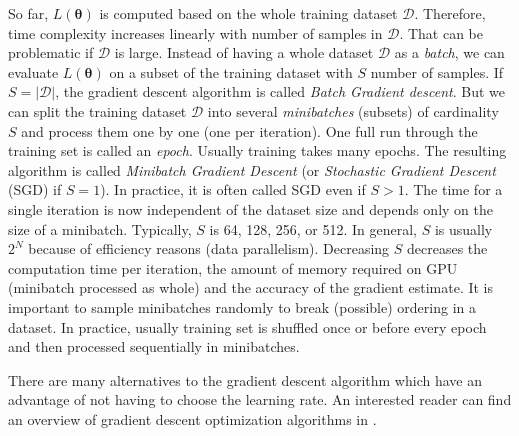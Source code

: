 So far, $L(\pmb \theta)$ is computed based on the whole training dataset $\mathcal{D}$. Therefore, time complexity increases linearly with number of samples in $\mathcal{D}$. That can be problematic if $\mathcal{D}$ is large. Instead of having a whole dataset $\mathcal{D}$ as a \textit{batch}, we can evaluate $L(\pmb \theta)$ on a subset of the training dataset with $S$ number of samples. If $S = |\mathcal{D}|$, the gradient descent algorithm is called \textit{Batch Gradient descent}. But we can split the training dataset $\mathcal{D}$ into several \textit{minibatches} (subsets) of cardinality $S$ and process them one by one (one per iteration). One full run through the training set is called an \textit{epoch}. Usually training takes many epochs. The resulting algorithm is called \textit{Minibatch Gradient Descent} (or \textit{Stochastic Gradient Descent} (SGD) if $S = 1$). In practice, it is often called SGD even if $S > 1$. The time for a single iteration is now independent of the dataset size and depends only on the size of a minibatch. Typically, $S$ is 64, 128, 256, or 512. In general, $S$ is usually $2^{N}$ because of efficiency reasons (data parallelism). Decreasing $S$ decreases the computation time per iteration, the amount of memory required on GPU (minibatch processed as whole) and the accuracy of the gradient estimate. It is important to sample minibatches randomly to break (possible) ordering in a dataset. In practice, usually training set is shuffled once or before every epoch and then processed sequentially in minibatches. 


There are many alternatives to the gradient descent algorithm which have an advantage of not having to choose the learning rate. An interested reader can find an overview of gradient descent optimization algorithms in \cite{gradient-descent-overview}. 



